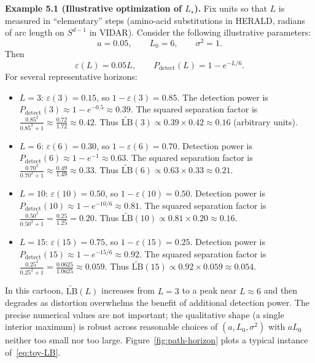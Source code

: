 \documentclass[11pt]{article}
\begin{document}
\begin{mdframed}[linewidth=0.6pt]
\noindent\textbf{Example 5.1 (Illustrative optimization of $L_\star$).}
Fix units so that $L$ is measured in ``elementary'' steps (amino-acid substitutions in HERALD,
radians of arc length on $S^{d-1}$ in VIDAR). Consider the following illustrative parameters:
\[
a = 0.05, \qquad
L_0 = 6, \qquad
\sigma^2 = 1.
\]
Then
\[
\varepsilon(L) = 0.05 L, \qquad
P_{\mathrm{detect}}(L) = 1 - e^{-L/6}.
\]
For several representative horizons:
\begin{itemize}[leftmargin=*]
  \item $L = 3$: $\varepsilon(3) = 0.15$, so $1-\varepsilon(3) = 0.85$. The detection power is
  $P_{\mathrm{detect}}(3) \approx 1 - e^{-0.5} \approx 0.39$. The squared separation factor is
  $\frac{0.85^2}{0.85^2 + 1} \approx \frac{0.72}{1.72} \approx 0.42$. Thus
  $\widetilde{\mathrm{LB}}(3) \propto 0.39 \times 0.42 \approx 0.16$ (arbitrary units).

  \item $L = 6$: $\varepsilon(6) = 0.30$, so $1-\varepsilon(6) = 0.70$. Detection power is
  $P_{\mathrm{detect}}(6) \approx 1 - e^{-1} \approx 0.63$. The squared separation factor is
  $\frac{0.70^2}{0.70^2 + 1} \approx \frac{0.49}{1.49} \approx 0.33$. Thus
  $\widetilde{\mathrm{LB}}(6) \propto 0.63 \times 0.33 \approx 0.21$.

  \item $L = 10$: $\varepsilon(10) = 0.50$, so $1-\varepsilon(10) = 0.50$. Detection power is
  $P_{\mathrm{detect}}(10) \approx 1 - e^{-10/6} \approx 0.81$. The squared separation factor is
  $\frac{0.50^2}{0.50^2 + 1} = \frac{0.25}{1.25} = 0.20$. Thus
  $\widetilde{\mathrm{LB}}(10) \propto 0.81 \times 0.20 \approx 0.16$.

  \item $L = 15$: $\varepsilon(15) = 0.75$, so $1-\varepsilon(15) = 0.25$. Detection power is
  $P_{\mathrm{detect}}(15) \approx 1 - e^{-15/6} \approx 0.92$. The squared separation factor is
  $\frac{0.25^2}{0.25^2 + 1} = \frac{0.0625}{1.0625} \approx 0.059$. Thus
  $\widetilde{\mathrm{LB}}(15) \propto 0.92 \times 0.059 \approx 0.054$.
\end{itemize}

In this cartoon, $\widetilde{\mathrm{LB}}(L)$ increases from $L=3$ to a peak near $L \approx 6$ and then
degrades as distortion overwhelms the benefit of additional detection power. The precise numerical
values are not important; the qualitative shape (a single interior maximum) is robust across
reasonable choices of $(a, L_0, \sigma^2)$ with $aL_0$ neither too small nor too large. Figure~\ref{fig:path-horizon}
plots a typical instance of~\eqref{eq:toy-LB}.
\end{mdframed}
\end{document}
